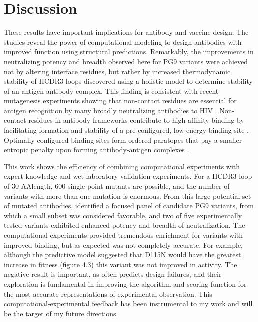 
\section{Discussion}
These results have important implications for antibody and vaccine design. The studies reveal the power of \rosetta computational modeling to design antibodies with improved function using structural predictions. Remarkably, the improvements in neutralizing potency and breadth observed here for PG9 variants were achieved not by altering interface residues, but rather by increased thermodynamic stability of HCDR3 loops discovered using a holistic model to determine stability of an antigen-antibody complex. This finding is consistent with recent mutagenesis experiments showing that non-contact residues are essential for antigen recognition by many broadly neutralizing antibodies to HIV \citep{Klein:2013iz}. Non-contact residues in antibody frameworks contribute to high affinity binding by facilitating formation and stability of a pre-configured, low energy binding site \citep{Willis:2013dd,Manivel:2000wk,Marlow:2010jl,Wedemayer:1997wn,Schmidt:2013ka}. Optimally configured binding sites form ordered paratopes that pay a smaller entropic penalty upon forming antibody-antigen complexes \citep{Marlow:2010jl}.

This work shows the efficiency of combining \rosettadesign computational experiments with expert knowledge and wet laboratory validation experiments. For a HCDR3 loop of 30-AAlength, 600 single point mutants are possible, and the number of variants with more than one mutation is enormous. From this large potential set of mutated antibodies, \rosettadesign identified a focused panel of candidate PG9 variants, from which a small subset was considered favorable, and two of five experimentally tested variants exhibited enhanced potency and breadth of neutralization. The computational experiments provided tremendous enrichment for variants with improved binding, but as expected was not completely accurate. For example, although the predictive model suggested that D115N would have the greatest increase in fitness (figure 4.3) this variant was not improved in activity.
The negative result is important, as \rosetta often predicts design failures, and their exploration is fundamental in improving the \rosetta algorithm and scoring function for the most accurate representations of experimental observation. This computational-experimental feedback has been instrumental to my work and will be the target of my future directions.


